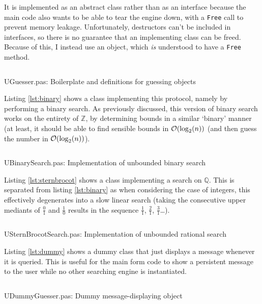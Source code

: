 \documentclass[a4paper,11pt]{article}
\begin{document}
    It is implemented as an abstract class rather than as an interface because
    the main code also wants to be able to tear the engine down, with a
    \texttt{Free} call to prevent memory leakage. Unfortunately, destructors
    can't be included in interfaces, so there is no guarantee that an
    implementing class can be freed. Because of this, I instead use an object,
    which \textit{is} understood to have a \texttt{Free} method.

\begin{longlisting}
\inputminted{Pascal}{../UGuesser.pas}
\caption{UGuesser.pas: Boilerplate and definitions for guessing objects}
\label{lst:guesser}
\end{longlisting}

    Listing \ref{lst:binary} shows a class implementing this protocol, namely by
    performing a binary search. As previously discussed, this version of binary
    search works on the entirety of \(\mathbb{Z}\), by determining bounds in a
    similar `binary' manner (at least, it should be able to find sensible bounds
    in \(\operatorname{\mathcal O}(\log_2(n))\) (and then guess the number in \(\operatorname{\mathcal O}(\log_2(n))\)).

\begin{longlisting}
\inputminted{Pascal}{../UBinarySearch.pas}
\caption{UBinarySearch.pas: Implementation of unbounded binary search}
\label{lst:binary}
\end{longlisting}

    Listing \ref{lst:sternbrocot} shows a class implementing a search on
    \(\mathbb{Q}\). This is separated from listing \ref{lst:binary} as when
    considering the case of integers, this effectively degenerates into a slow
    linear search (taking the consecutive upper mediants of \(\frac{0}{1}\) and
    \(\frac{1}{0}\) results in the sequence \(\frac{1}{1}\), \(\frac{2}{1}\),
    \(\frac{3}{1}\)\ldots).

\begin{longlisting}
\inputminted{Pascal}{../USternBrocotSearch.pas}
\caption{USternBrocotSearch.pas: Implementation of unbounded rational search}
\label{lst:sternbrocot}
\end{longlisting}

    Listing \ref{lst:dummy} shows a dummy class that just displays a message
    whenever it is queried. This is useful for the main form code to show a
    persistent message to the user while no other searching engine is
    instantiated.

\begin{longlisting}
\inputminted{Pascal}{../UDummyGuesser.pas}
\caption{UDummyGuesser.pas: Dummy message-displaying object}
\label{lst:dummy}
\end{longlisting}
\end{document}
